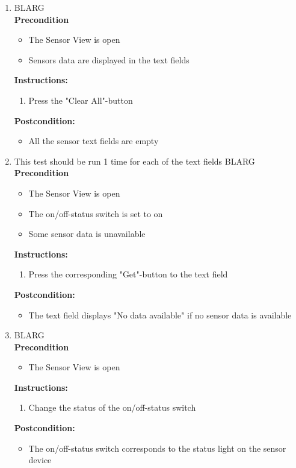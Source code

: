 \documentclass[a4paper]{article}
\newlength{\testlabellength}
\newenvironment{testlist}{\begin{enumerate}[label=\bfseries Instruction \thesubsection.\arabic* , labelindent=0pt, labelwidth=\testlabellength , leftmargin=2cm]}{\end{enumerate}}
\newenvironment{precondition}{
{\color{white}BLARG}\\ 
\textbf{Precondition}
\begin{itemize}[labelindent=0cm, labelwidth=2cm , leftmargin=1cm]
}
{\end{itemize}}
\newenvironment{instruction}{
\textbf{Instructions:}
\begin{enumerate}[label=\bfseries  \arabic*., labelindent=0cm, labelwidth=2cm , leftmargin=1cm]
}
{\end{enumerate}}
\newenvironment{postcondition}{
\textbf{Postcondition:}
\begin{itemize}[labelindent=0cm, labelwidth=2cm , leftmargin=1cm]
}
{\end{itemize}}
\begin{document}
\begin{appendices}
\begin{testlist}
	\item
		\begin{precondition}
			\item The Sensor View is open
			\item Sensors data are displayed in the text fields
		\end{precondition}
		\begin{instruction}
			\item Press the "Clear All"-button
		\end{instruction}
		\begin{postcondition}
			\item All the sensor text fields are empty
		\end{postcondition}

	\item This test should be run 1 time for each of the text fields
		\begin{precondition}
			\item The Sensor View is open
			\item The on/off-status switch is set to on
			\item Some sensor data is unavailable
		\end{precondition}
		\begin{instruction}
			\item Press the corresponding "Get"-button to the text field
    	\end{instruction}
    	\begin{postcondition}
    		\item The text field displays "No data available" if no sensor data is available
    	\end{postcondition}

	\item
		\begin{precondition}
			\item The Sensor View is open
		\end{precondition}
		\begin{instruction}
			\item Change the status of the on/off-status switch
		\end{instruction}
		\begin{postcondition}
			\item The on/off-status switch corresponds to the status light on the sensor device
		\end{postcondition}


\end{testlist}
\end{appendices}
\end{document}
